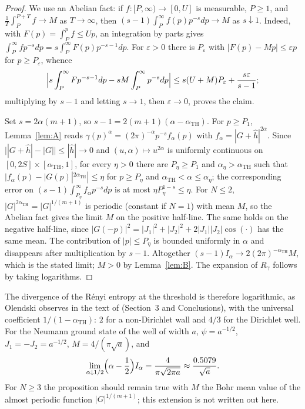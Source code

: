 \documentclass[11pt,a4paper]{article}
\theoremstyle{definition}
\theoremstyle{plain}
\newcommand{\aTH}{\alpha_{\mathrm{TH}}}
\begin{document}
\begin{proof}
We use an Abelian fact: if $f:[P,\infty)\to[0,U]$ is measurable, $P\ge1$, and
$\frac1T\int_P^{P+T}f\to M$ as $T\to\infty$, then
$(s-1)\int_P^\infty f(p)p^{-s}dp\to M$ as $s\downarrow1$. Indeed, with
$F(p)=\int_P^pf\le Up$, an integration by parts gives
$\int_P^\infty fp^{-s}dp=s\int_P^\infty F(p)p^{-s-1}dp$. For $\varepsilon>0$
there is $P_\varepsilon$ with $|F(p)-Mp|\le\varepsilon p$ for $p\ge P_\varepsilon$,
whence
\[
\Bigl|s\int_P^\infty Fp^{-s-1}dp-sM\int_P^\infty p^{-s}dp\Bigr|
\le s(U+M)P_\varepsilon+\frac{s\varepsilon}{s-1};
\]
multiplying by $s-1$ and letting $s\to1$, then $\varepsilon\to0$, proves the
claim.

Set $s=2\alpha(m+1)$, so $s-1=2(m+1)(\alpha-\aTH)$. For $p\ge P_1$,
Lemma~\ref{lem:A} reads $\gamma(p)^\alpha=(2\pi)^{-\alpha}p^{-s}f_\alpha(p)$
with $f_\alpha=|G+\hat h|^{2\alpha}$. Since
$\bigl||G+\hat h|-|G|\bigr|\le|\hat h|\to0$ and $(u,\alpha)\mapsto u^{2\alpha}$
is uniformly continuous on $[0,2S]\times[\aTH,1]$, for every $\eta>0$ there
are $P_\eta\ge P_1$ and $\alpha_\eta>\aTH$ such that
$|f_\alpha(p)-|G(p)|^{2\aTH}|\le\eta$ for $p\ge P_\eta$ and
$\aTH<\alpha\le\alpha_\eta$; the corresponding error on
$(s-1)\int_{P_\eta}^\infty f_\alpha p^{-s}dp$ is at most
$\eta P_\eta^{1-s}\le\eta$. For $N\le2$, $|G|^{2\aTH}=|G|^{1/(m+1)}$ is
periodic (constant if $N=1$) with mean $M$, so the Abelian fact gives the
limit $M$ on the positive half-line. The same holds on the negative half-line,
since $|G(-p)|^2=|J_1|^2+|J_2|^2+2|J_1||J_2|\cos(\cdot)$ has the same mean. The
contribution of $|p|\le P_\eta$ is bounded uniformly in $\alpha$ and
disappears after multiplication by $s-1$. Altogether
$(s-1)I_\alpha\to2(2\pi)^{-\aTH}M$, which is the stated limit; $M>0$ by
Lemma~\ref{lem:B}. The expansion of $R_\gamma$ follows by taking logarithms.
\end{proof}

The divergence of the R\'enyi entropy at the threshold is therefore
logarithmic, as Olendski observes in the text of \cite{Olendski2020}
(Section~3 and Conclusions), with the
universal coefficient $1/(1-\aTH)$: $2$ for a non-Dirichlet wall and $4/3$ for
the Dirichlet well. For the Neumann ground state of the well of width $a$,
$\psi=a^{-1/2}$, $J_1=-J_2=a^{-1/2}$, $M=4/(\pi\sqrt a)$, and
\[
\lim_{\alpha\downarrow1/2}\Bigl(\alpha-\frac12\Bigr)I_\alpha
=\frac{4}{\pi\sqrt{2\pi a}}\approx\frac{0.5079}{\sqrt a}.
\]
For $N\ge3$ the proposition should remain true with $M$ the Bohr mean value of
the almost periodic function $|G|^{1/(m+1)}$; this extension is not written
out here.
\end{document}
